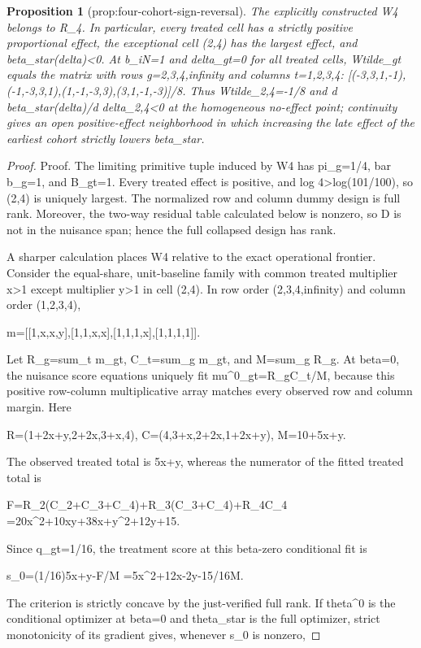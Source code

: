 \documentclass{article}
\newtheorem{proposition}{Proposition}
\begin{document}
\begin{proposition}[prop:four-cohort-sign-reversal]\label{prop:four-cohort-sign-reversal}
The explicitly constructed W4 belongs to R_4. In particular, every treated cell has a strictly positive proportional effect, the exceptional cell (2,4) has the largest effect, and beta_star(delta)<0. At b_iN=1 and delta_gt=0 for all treated cells, Wtilde_gt equals the matrix with rows g=2,3,4,infinity and columns t=1,2,3,4: [(-3,3,1,-1),(-1,-3,3,1),(1,-1,-3,3),(3,1,-1,-3)]/8. Thus Wtilde_2,4=-1/8 and d beta_star(delta)/d delta_2,4<0 at the homogeneous no-effect point; continuity gives an open positive-effect neighborhood in which increasing the late effect of the earliest cohort strictly lowers beta_star.
\end{proposition}
\begin{proof}
Proof. The limiting primitive tuple induced by W4 has pi_g=1/4, bar b_g=1, and B_{gt}=1. Every treated effect is positive, and log 4>log(101/100), so (2,4) is uniquely largest. The normalized row and column dummy design is full rank. Moreover, the two-way residual table calculated below is nonzero, so D is not in the nuisance span; hence the full collapsed design has rank.

A sharper calculation places W4 relative to the exact operational frontier. Consider the equal-share, unit-baseline family with common treated multiplier x>1 except multiplier y>1 in cell (2,4). In row order (2,3,4,infinity) and column order (1,2,3,4),

  m=[[1,x,x,y],[1,1,x,x],[1,1,1,x],[1,1,1,1]].

Let R_g=sum_t m_{gt}, C_t=sum_g m_{gt}, and M=sum_g R_g. At beta=0, the nuisance score equations uniquely fit mu^0_{gt}=R_gC_t/M, because this positive row-column multiplicative array matches every observed row and column margin. Here

  R=(1+2x+y,2+2x,3+x,4),
  C=(4,3+x,2+2x,1+2x+y),
  M=10+5x+y.

The observed treated total is 5x+y, whereas the numerator of the fitted treated total is

  F=R_2(C_2+C_3+C_4)+R_3(C_3+C_4)+R_4C_4
   =20x^2+10xy+38x+y^2+12y+15.

Since q_{gt}=1/16, the treatment score at this beta-zero conditional fit is

  s_0=(1/16){5x+y-F/M}
     ={5x^2+12x-2y-15}/{16M}.

The criterion is strictly concave by the just-verified full rank. If theta^0 is the conditional optimizer at beta=0 and theta_star is the full optimizer, strict monotonicity of its gradient gives, whenever s_0 is nonzero,


\end{proof}
\end{document}
